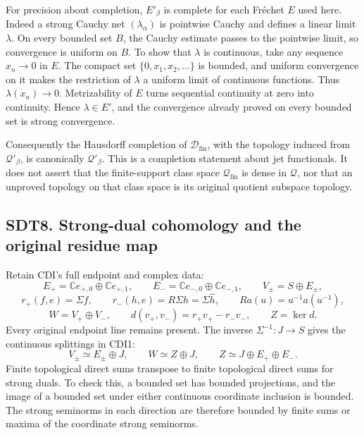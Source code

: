 For precision about completion, \(E'_\beta\) is complete for each
Fréchet \(E\) used here. Indeed a strong Cauchy net \((\lambda_\alpha)\)
is pointwise Cauchy and defines a linear limit \(\lambda\). On every
bounded set \(B\), the Cauchy estimate passes to the pointwise limit, so
convergence is uniform on \(B\). To show that \(\lambda\) is continuous,
take any sequence \(x_n\to0\) in \(E\). The compact set
\(\{0,x_1,x_2,\ldots\}\) is bounded, and uniform convergence on it makes
the restriction of \(\lambda\) a uniform limit of continuous functions.
Thus \(\lambda(x_n)\to0\). Metrizability of \(E\) turns sequential
continuity at zero into continuity. Hence \(\lambda\in E'\), and the
convergence already proved on every bounded set is strong convergence.

Consequently the Hausdorff completion of \(\mathscr D_{\mathrm{fin}}\),
with the topology induced from \(\mathcal Q'_\beta\), is canonically
\(\mathcal Q'_\beta\). This is a completion statement about jet
functionals. It does not assert that the finite-support class space
\(\mathcal Q_{\mathrm{fin}}\) is dense in \(\mathcal Q\), nor that an
unproved topology on that class space is its original quotient subspace
topology.

\subsection{SDT8. Strong-dual cohomology and the original residue
map}\label{sdt8.-strong-dual-cohomology-and-the-original-residue-map}

Retain CDI's full endpoint and complex data: \[
E_+=\mathbb Ce_{+,0}\oplus\mathbb Ce_{+,1},\qquad
E_-=\mathbb Ce_{-,0}\oplus\mathbb Ce_{-,1},\qquad
V_\pm=S\oplus E_\pm,
\] \[
r_+(f,e)=\Sigma f,\qquad
r_-(h,e)=R\Sigma h=\Sigma\widehat h,\qquad
Ra(u)=u^{-1}a(u^{-1}),
\] \[
W=V_+\oplus V_-,\qquad
d(v_+,v_-)=r_+v_+-r_-v_-,\qquad Z=\ker d.
\tag{SDT8.1}
\] Every original endpoint line remains present. The inverse
\(\Sigma^{-1}:J\to S\) gives the continuous splittings in CDI1: \[
V_\pm\simeq E_\pm\oplus J,\qquad
W\simeq Z\oplus J,\qquad
Z\simeq J\oplus E_+\oplus E_-.
\tag{SDT8.2}
\] Finite topological direct sums transpose to finite topological direct
sums for strong duals. To check this, a bounded set has bounded
projections, and the image of a bounded set under either continuous
coordinate inclusion is bounded. The strong seminorms in each direction
are therefore bounded by finite sums or maxima of the coordinate strong
seminorms.

